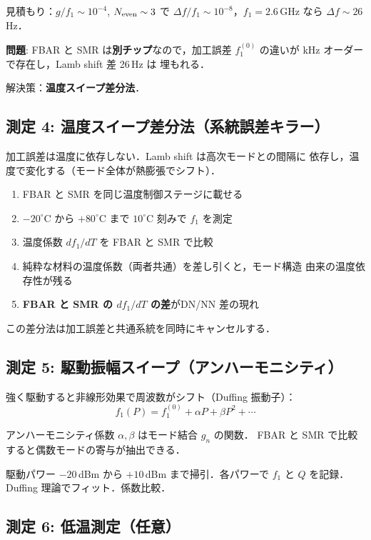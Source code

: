 \documentclass[11pt,a4paper]{article}
\begin{document}
見積もり：$g/f_1 \sim 10^{-4}$, $N_{\rm even} \sim 3$ で
$\Delta f/f_1 \sim 10^{-8}$，$f_1 = 2.6$\,GHz なら $\Delta f \sim 26$\,Hz．

\textbf{問題}: FBAR と SMR は\textbf{別チップ}なので，加工誤差
$f_1^{(0)}$ の違いが kHz オーダーで存在し，Lamb shift 差 26\,Hz は
埋もれる．

解決策：\textbf{温度スイープ差分法}．

\subsection{測定 4: 温度スイープ差分法（系統誤差キラー）}

加工誤差は温度に依存しない．Lamb shift は高次モードとの間隔に
依存し，温度で変化する（モード全体が熱膨張でシフト）．

\begin{enumerate}
\item FBAR と SMR を同じ温度制御ステージに載せる
\item $-20^\circ$C から $+80^\circ$C まで $10^\circ$C 刻みで $f_1$ を測定
\item 温度係数 $df_1/dT$ を FBAR と SMR で比較
\item 純粋な材料の温度係数（両者共通）を差し引くと，モード構造
由来の温度依存性が残る
\item \textbf{FBAR と SMR の $df_1/dT$ の差}がDN/NN 差の現れ
\end{enumerate}

この差分法は加工誤差と共通系統を同時にキャンセルする．

\subsection{測定 5: 駆動振幅スイープ（アンハーモニシティ）}

強く駆動すると非線形効果で周波数がシフト（Duffing 振動子）：
\begin{equation}
  f_1(P) = f_1^{(0)} + \alpha P + \beta P^2 + \cdots
\end{equation}

アンハーモニシティ係数 $\alpha, \beta$ はモード結合 $g_n$ の関数．
FBAR と SMR で比較すると偶数モードの寄与が抽出できる．

駆動パワー $-20$\,dBm から $+10$\,dBm まで掃引．各パワーで $f_1$ と
$Q$ を記録．Duffing 理論でフィット．係数比較．

\subsection{測定 6: 低温測定（任意）}
\end{document}
